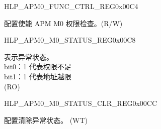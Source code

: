 \begin{register}{H}{LP\_APM0\_FUNC\_CTRL\_REG}{0x00C4}\label{regdesc:LPAPM0FUNCCTRLREG}
%
%
\regnewline%
\begin{regdesc}\begin{reglist}
\label{fielddesc:LPAPM0M0FUNCEN}\item [LP\_APM0\_M0\_FUNC\_EN] 配置使能 APM M0 权限检查。(R/W)
\end{reglist}\end{regdesc}
\end{register}


\begin{register}{H}{LP\_APM0\_M0\_STATUS\_REG}{0x00C8}\label{regdesc:LPAPM0M0STATUSREG}
%
%
\regnewline%
\begin{regdesc}\begin{reglist}
\label{fielddesc:LPAPM0M0EXCEPTIONSTATUS}\item [LP\_APM0\_M0\_EXCEPTION\_STATUS] 表示异常状态。\\
bit0：1 代表权限不足 \\
bit1：1 代表地址越限  \\ (RO)
\end{reglist}\end{regdesc}
\end{register}


\begin{register}{H}{LP\_APM0\_M0\_STATUS\_CLR\_REG}{0x00CC}\label{regdesc:LPAPM0M0STATUSCLRREG}
%
%
\regnewline%
\begin{regdesc}\begin{reglist}
\label{fielddesc:LPAPM0M0REGIONSTATUSCLR}\item [LP\_APM0\_M0\_REGION\_STATUS\_CLR] 配置清除异常状态。 (WT)
\end{reglist}\end{regdesc}
\end{register}


